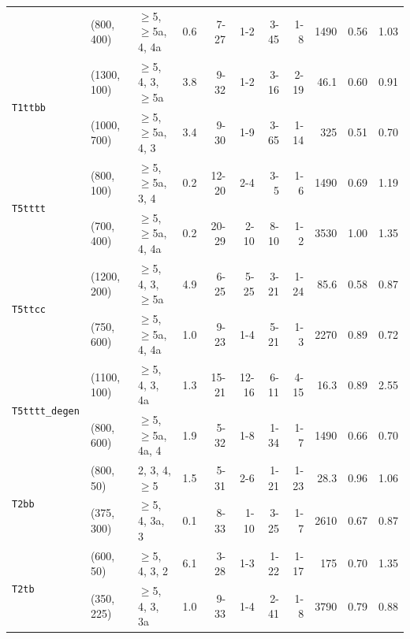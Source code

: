\begin{table}[tb]
\begin{tabular}{ lllcrrrrrcc }
  & (800, 400)  & $\geq$5, $\geq$5a, 4, 4a & \phantom{1}0.6 & 7-27  & 1-2   & 3-45  & 1-8  & 1490 & 0.56 & 1.03 \\ [0.5ex]
    \multirow{2}{*}{\texttt{T1ttbb}}
  & (1300, 100) & $\geq$5, 4, 3, $\geq$5a  & \phantom{1}3.8 & 9-32  & 1-2   & 3-16  & 2-19 & 46.1 & 0.60 & 0.91 \\
  & (1000, 700) & $\geq$5, $\geq$5a, 4, 3  & \phantom{1}3.4 & 9-30  & 1-9   & 3-65  & 1-14 & 325  & 0.51 & 0.70 \\ [0.5ex]
    \multirow{2}{*}{\texttt{T5tttt}}
  & (800, 100)  & $\geq$5, $\geq$5a, 3, 4  & \phantom{1}0.2 & 12-20 & 2-4   & 3-5   & 1-6  & 1490 & 0.69 & 1.19 \\
  & (700, 400)  & $\geq$5, $\geq$5a, 4, 4a & \phantom{1}0.2 & 20-29 & 2-10  & 8-10  & 1-2  & 3530 & 1.00 & 1.35 \\ [0.5ex]
    \multirow{2}{*}{\texttt{T5ttcc}}  
  & (1200, 200) & $\geq$5, 4, 3, $\geq$5a  & \phantom{1}4.9 & 6-25  & 5-25  & 3-21  & 1-24 & 85.6 & 0.58 & 0.87 \\
  & (750, 600)  & $\geq$5, $\geq$5a, 4, 4a & \phantom{1}1.0 & 9-23  & 1-4   & 5-21  & 1-3  & 2270 & 0.89 & 0.72 \\ [0.5ex]
    \multirow{2}{*}{\texttt{T5tttt\_degen}} 
  & (1100, 100) & $\geq$5, 4, 3, 4a        & \phantom{1}1.3 & 15-21 & 12-16 & 6-11  & 4-15 & 16.3 & 0.89 & 2.55 \\
  & (800, 600)  & $\geq$5, $\geq$5a, 4a, 4 & \phantom{1}1.9 & 5-32  & 1-8   & 1-34  & 1-7  & 1490 & 0.66 & 0.70 \\ [0.5ex]
    \multirow{2}{*}{\texttt{T2bb}}
  & (800, 50)   & 2, 3, 4, $\geq$5         & \phantom{1}1.5 & 5-31  & 2-6   & 1-21  & 1-23 & 28.3 & 0.96 & 1.06 \\
  & (375, 300)  & $\geq$5, 4, 3a, 3        & \phantom{1}0.1 & 8-33  & 1-10  & 3-25  & 1-7  & 2610 & 0.67 & 0.87 \\ [0.5ex]
    \multirow{2}{*}{\texttt{T2tb}}
  & (600, 50)   & $\geq$5, 4, 3, 2         & \phantom{1}6.1 & 3-28  & 1-3   & 1-22  & 1-17 & 175  & 0.70 & 1.35 \\
  & (350, 225)  & $\geq$5, 4, 3, 3a        & \phantom{1}1.0 & 9-33  & 1-4   & 2-41  & 1-8  & 3790 & 0.79 & 0.88 \\ [0.5ex]

\end{tabular}
\end{table}
